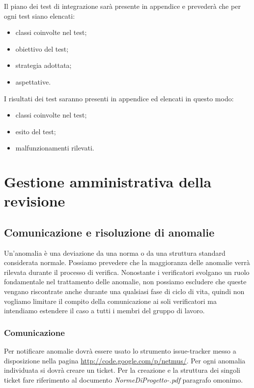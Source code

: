 Il piano dei test di integrazione sar\`a presente in appendice e preveder\`a
che per ogni test siano elencati:
\begin{itemize}
  \item classi coinvolte nel test;
  \item obiettivo del test;
  \item strategia adottata;
  \item aspettative.
\end{itemize}

I risultati dei test saranno presenti in appendice ed elencati in
questo modo:
\begin{itemize}
  \item classi coinvolte nel test;
  \item esito del test;
  \item malfunzionamenti rilevati.
\end{itemize}



\chapter{Gestione amministrativa della \\revisione}
\thispagestyle{fancy} %

\section{Comunicazione e risoluzione di anomalie}

Un'anomalia \`e una deviazione da una norma o da una struttura standard
considerata normale. Possiamo prevedere che la maggioranza delle anomalie verr\`a 
rilevata durante il processo di verifica. Nonostante i verificatori svolgano un
ruolo fondamentale nel trattamento delle anomalie, non possiamo escludere che
queste vengano riscontrate anche durante una qualsiasi fase di ciclo di vita,
quindi non vogliamo limitare il compito della comunicazione ai soli verificatori ma 
intendiamo estendere il caso a tutti i membri del gruppo di lavoro.

\subsection{Comunicazione}

Per notificare anomalie dovr\`a essere usato lo strumento issue-tracker messo a
disposizione nella pagina \url{http://code.google.com/p/netmus/}. Per ogni
anomalia individuata si dovr\`a creare un ticket. Per la creazione e la struttura dei
singoli ticket fare riferimento al documento \emph{NormeDiProgetto-\versionenormeprogetto.pdf} paragrafo omonimo.


